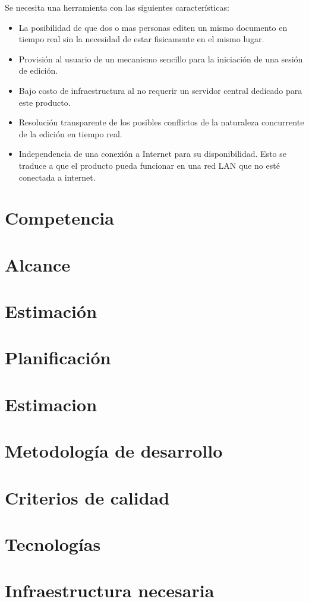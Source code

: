 \documentclass[12pt,a4paper]{article}
\begin{document}
	Se necesita una herramienta con las siguientes características:
	\begin{itemize}
		\item La posibilidad de que dos o mas personas editen un mismo documento en tiempo real sin la necesidad de estar fisicamente en el mismo lugar.
		\item Provisión al usuario de un mecanismo sencillo para la iniciación de una sesión de edición.
		\item Bajo costo de infraestructura al no requerir un servidor central dedicado para este producto.
		\item Resolución transparente de los posibles conflictos de la naturaleza concurrente de la edición en tiempo real.
		\item Independencia de una conexión a Internet para su disponibilidad. Esto se traduce a que el producto pueda funcionar en una red LAN que no esté conectada a internet.
	\end{itemize}

	\section{Competencia}
	\section{Alcance}
	\section{Estimación}
	\section{Planificación}
	\section{Estimacion}
	\section{Metodología de desarrollo}
	\section{Criterios de calidad}
	\section{Tecnologías}
	\section{Infraestructura necesaria}
\end{document}

